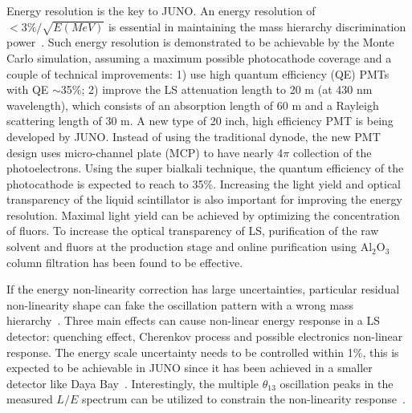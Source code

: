 Energy resolution is the key to JUNO. An energy resolution of $<3\%/\sqrt{E(MeV)}$ is essential in maintaining the mass hierarchy discrimination power~\cite{Li-PRD13}. Such energy resolution is demonstrated to be achievable by the Monte Carlo simulation, assuming a maximum possible photocathode coverage and a couple of technical improvements: 1) use high quantum efficiency (QE) PMTs with QE $\sim$35\%; 2) improve the LS attenuation length to 20 m (at 430 nm wavelength), which consists of an absorption length of 60 m and a Rayleigh scattering length of 30 m. A new type of 20 inch, high efficiency PMT is being developed by JUNO. Instead of using the traditional dynode, the new PMT design uses micro-channel plate (MCP) to have nearly 4$\pi$ collection of the photoelectrons. Using the super bialkali technique, the quantum efficiency of the photocathode is expected to reach to 35\%. Increasing the light yield and optical transparency of the liquid scintillator is also important for improving the energy resolution. Maximal light yield can be achieved by optimizing the concentration of fluors. To increase the optical transparency of LS, purification of the raw solvent and fluors at the production stage and online purification using Al$_2$O$_3$ column filtration has been found to be effective.


If the energy non-linearity correction has large uncertainties, particular residual non-linearity shape can fake the oscillation pattern with a wrong mass hierarchy~\cite{Qian-PRD13}. 
Three main effects can cause non-linear energy response in a LS detector: quenching effect, Cherenkov process and possible electronics non-linear response. 
The energy scale uncertainty needs to be controlled within 1\%, this is expected to be achievable in JUNO since it has been achieved in a smaller detector like Daya Bay~\cite{Zhang-Neutrino14}. Interestingly, the multiple $\theta_{13}$ oscillation peaks in the measured $L/E$ spectrum can be utilized to constrain the non-linearity response~\cite{Li-PRD13}.

